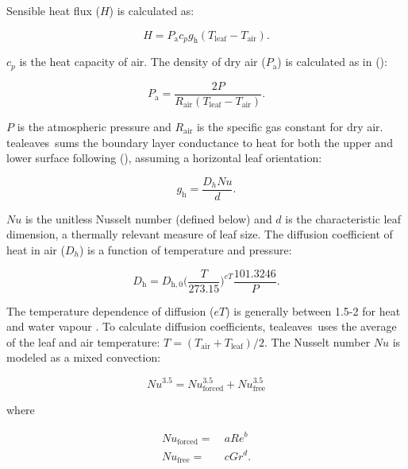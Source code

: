 \documentclass[11pt, oneside]{article}
\newcommand{\pkg}[1]{{\fontseries{b}\selectfont #1}}
\newcommand{\tealeaves}{\pkg{tealeaves}}
\begin{document}
Sensible heat flux ($H$) is calculated as:

\begin{equation}
  H = P_\mathrm{a} c_p g_\mathrm{h} (T_\mathrm{leaf} - T_\mathrm{air}).
\end{equation}

$c_p$ is the heat capacity of air. The density of dry air ($P_\mathrm{a}$) is calculated as in \citeauthor{Foster_Smith_1986} (\citeyear{Foster_Smith_1986}):

\begin{equation}
  P_\mathrm{a} = \frac{2 P}{R_\mathrm{air} (T_\mathrm{leaf} - T_\mathrm{air})}.
\end{equation}

$P$ is the atmospheric pressure and $R_\mathrm{air}$ is the specific gas constant for dry air. \tealeaves~sums the boundary layer conductance to heat for both the upper and lower surface following \citeauthor{Foster_Smith_1986} (\citeyear{Foster_Smith_1986}), assuming a horizontal leaf orientation:

\begin{equation} \label{eq:g_h}
  g_\mathrm{h} = \frac{D_h \mathit{Nu}}{d}.
\end{equation}

$\mathit{Nu}$ is the unitless Nusselt number (defined below) and $d$ is the characteristic leaf dimension, a thermally relevant measure of leaf size. The diffusion coefficient of heat in air ($D_h$) is a function of temperature and pressure:

\begin{equation} \label{eq:D_x}
    D_\mathrm{h} = D_\mathrm{h,0} \Big(\frac{T}{273.15}\Big) ^ {\mathit{eT}} \frac{101.3246}{P}.
\end{equation}

The temperature dependence of diffusion ($\mathit{eT}$) is generally between 1.5-2 for heat and water vapour \citep{Monteith_Unsworth_2013}. To calculate diffusion coefficients, \tealeaves~uses the average of the leaf and air temperature: $T = (T_\mathrm{air} + T_\mathrm{leaf}) / 2$. The Nusselt number $\mathit{Nu}$ is modeled as a mixed convection:

\begin{equation}
  \label{eq:nusselt}
  \mathit{Nu} ^ {3.5} = \mathit{Nu}_\mathrm{forced} ^ {3.5} + \mathit{Nu}_\mathrm{free} ^ {3.5}
\end{equation}

where

\begin{align}
  \mathit{Nu}_\mathrm{forced} =  & ~ a \mathit{Re} ^ b \\
  \mathit{Nu}_\mathrm{free} =    & ~ c \mathit{Gr} ^ d.
\end{align}
\end{document}
